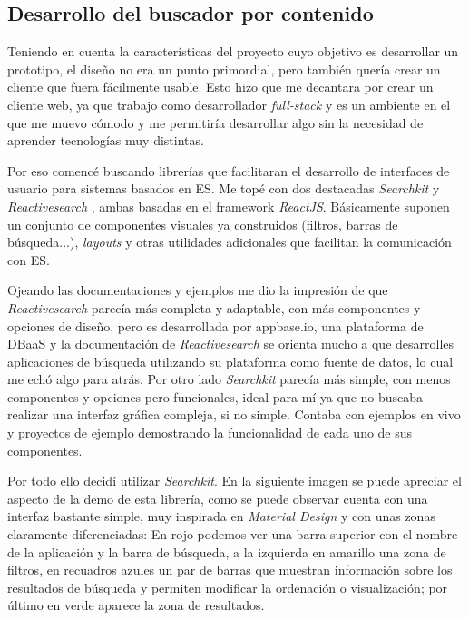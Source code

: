 \subsection{Desarrollo del buscador por contenido}
Teniendo en cuenta la características del proyecto cuyo objetivo es desarrollar un prototipo, el diseño no era un punto primordial, pero también quería crear un cliente que fuera fácilmente usable. Esto hizo que me decantara por crear un cliente web, ya que trabajo como desarrollador \textit{full-stack} y es un ambiente en el que me muevo cómodo y me permitiría desarrollar algo sin la necesidad de aprender tecnologías muy distintas.

Por eso comencé buscando librerías que facilitaran el desarrollo de interfaces de usuario para sistemas basados en \acrshort{ES}. Me topé con dos destacadas \textit{Searchkit} \cite{searchKit} y \textit{Reactivesearch} \cite{reactiveSearch}, ambas basadas en el \gls{framework} \textit{ReactJS}. Básicamente suponen un conjunto de componentes visuales ya construidos (filtros, barras de búsqueda...), \textit{layouts} y otras utilidades adicionales que facilitan la comunicación con \acrshort{ES}.

Ojeando las documentaciones y ejemplos me dio la impresión de que \textit{Reactivesearch} parecía más completa y adaptable, con más componentes y opciones de diseño, pero es desarrollada por appbase.io, una plataforma de \acrshort{DBaaS} y la documentación de \textit{Reactivesearch} se orienta mucho a que desarrolles aplicaciones de búsqueda utilizando su plataforma como fuente de datos, lo cual me echó algo para atrás. Por otro lado \textit{Searchkit} parecía más simple, con menos componentes y opciones pero funcionales, ideal para mí ya que no buscaba realizar una interfaz gráfica compleja, si no simple. Contaba con ejemplos en vivo y proyectos de ejemplo demostrando la funcionalidad de cada uno de sus componentes.

Por todo ello decidí utilizar \textit{Searchkit}. En la siguiente imagen se puede apreciar el aspecto de la demo de esta librería, como se puede observar cuenta con una interfaz bastante simple, muy inspirada en \textit{Material Design} \cite{materialDesign} y con unas zonas claramente diferenciadas: En rojo podemos ver una barra superior con el nombre de la aplicación y la barra de búsqueda, a la izquierda en amarillo una zona de filtros, en recuadros azules un par de barras que muestran información sobre los resultados de búsqueda y permiten modificar la ordenación o visualización; por último en verde aparece la zona de resultados.


